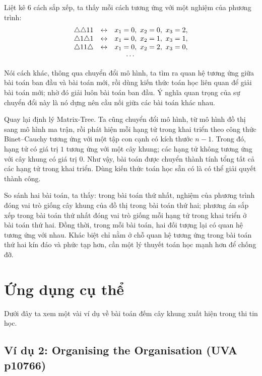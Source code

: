 \documentclass[11pt]{article}
\begin{document}
Liệt kê \(6\) cách sắp xếp, ta thấy mỗi cách tương ứng với một nghiệm của
phương trình:
\[
\begin{array}{rcl}
  \triangle\triangle 11 &\leftrightarrow& x_1=0,\ x_2=0,\ x_3=2,\\
  \triangle 1\triangle 1 &\leftrightarrow& x_1=0,\ x_2=1,\ x_3=1,\\
  \triangle 11\triangle &\leftrightarrow& x_1=0,\ x_2=2,\ x_3=0,\\
  \multicolumn{3}{c}{\cdots}
\end{array}
\]

Nói cách khác, thông qua chuyển đổi mô hình, ta tìm ra quan hệ tương ứng giữa
bài toán ban đầu và bài toán mới, rồi dùng kiến thức toán học liên quan để
giải bài toán mới; nhờ đó giải luôn bài toán ban đầu. Ý nghĩa quan trọng của
sự chuyển đổi này là nó dựng nên cầu nối giữa các bài toán khác nhau.

Quay lại định lý Matrix-Tree. Ta cũng chuyển đổi mô hình, từ mô hình đồ thị
sang mô hình ma trận, rồi phát hiện mỗi hạng tử trong khai triển theo công
thức Binet--Cauchy tương ứng với một tập con cạnh có kích thước \(n-1\). Trong
đó, hạng tử có giá trị \(1\) tương ứng với một cây khung; các hạng tử không
tương ứng với cây khung có giá trị \(0\). Như vậy, bài toán được chuyển thành
tính tổng tất cả các hạng tử trong khai triển. Dùng kiến thức toán học sẵn có
là có thể giải quyết thành công.

So sánh hai bài toán, ta thấy: trong bài toán thứ nhất, nghiệm của phương
trình đóng vai trò giống cây khung của đồ thị trong bài toán thứ hai; phương
án sắp xếp trong bài toán thứ nhất đóng vai trò giống mỗi hạng tử trong khai
triển ở bài toán thứ hai. Đồng thời, trong mỗi bài toán, hai đối tượng lại có
quan hệ tương ứng với nhau. Khác biệt chỉ nằm ở chỗ quan hệ tương ứng trong
bài toán thứ hai kín đáo và phức tạp hơn, cần một lý thuyết toán học mạnh hơn
để chống đỡ.

\section{Ứng dụng cụ thể}

Dưới đây ta xem một vài ví dụ về bài toán đếm cây khung xuất hiện trong thi
tin học.

\subsection*{Ví dụ 2: Organising the Organisation (UVA p10766)}
\end{document}
